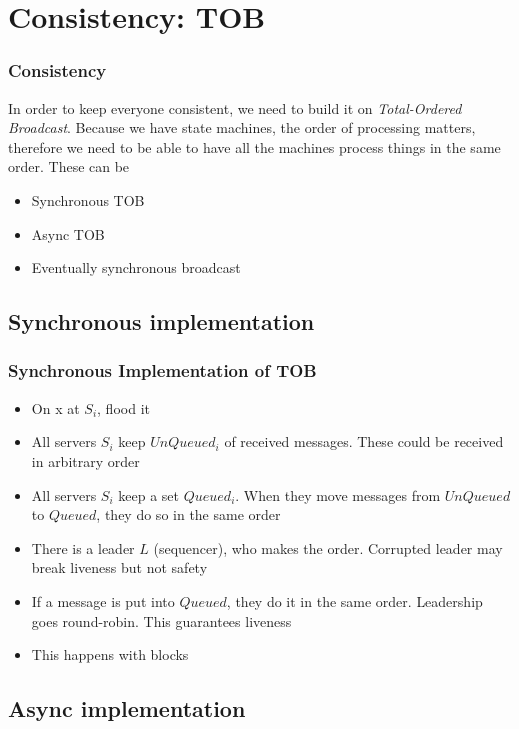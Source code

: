 \section{Consistency: TOB}
    \begin{frame}
        \frametitle{Consistency}
            In order to keep everyone consistent, we need to build it on \textit{Total-Ordered Broadcast}. Because we have state machines, the order of processing matters, therefore we need to be able to have all the machines process things in the same order.
            These can be 
            \begin{itemize}
                \item Synchronous TOB
                \item Async TOB
                \item Eventually synchronous broadcast
            \end{itemize}
    \end{frame}
    \subsection{Synchronous implementation}
        \begin{frame}
            \frametitle{Synchronous Implementation of TOB}
                \begin{itemize}
                    \item On x at $S_i$, flood it 
                    \item All servers $S_i$ keep $UnQueued_i$ of received messages. These could be received in arbitrary order
                    \item All servers $S_i$ keep a set $Queued_i$. When they move messages from $UnQueued$ to $Queued$, they do so in the same order
                    \item There is a leader $L$ (sequencer), who makes the order. Corrupted leader may break liveness but not safety
                    \item If a message is put into $Queued$, they do it in the same order. Leadership goes round-robin. This guarantees liveness
                    \item This happens with blocks
                \end{itemize}
        \end{frame}

    \subsection{Async implementation}
